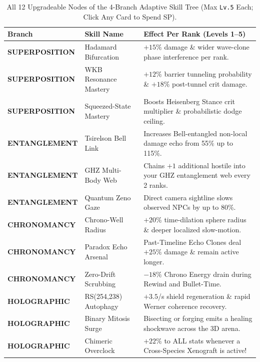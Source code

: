 \documentclass[10pt,letterpaper]{article}
\begin{document}
\begin{table}[ht]
\centering
\caption[All 12 Nodes of the 4-Branch Adaptive Skill Tree]{All 12 Upgradeable Nodes of the 4-Branch Adaptive Skill Tree (Max \texttt{Lv.5} Each; Click Any Card to Spend SP).}
\label{tab:skills}
\footnotesize
\begin{tabularx}{\textwidth}{@{} L{3.1cm} L{3.6cm} Y @{}}
\toprule
\textbf{Branch} & \textbf{Skill Name} & \textbf{Effect Per Rank (Levels 1--5)} \\
\midrule
\textbf{\color{plnCyan}SUPERPOSITION} & Hadamard Bifurcation & $+15\%$ damage \& wider wave-clone phase interference per rank. \\
\textbf{\color{plnCyan}SUPERPOSITION} & WKB Resonance Mastery & $+12\%$ barrier tunneling probability \& $+18\%$ post-tunnel crit damage. \\
\textbf{\color{plnCyan}SUPERPOSITION} & Squeezed-State Mastery & Boosts Heisenberg Stance crit multiplier \& probabilistic dodge ceiling. \\
\midrule
\textbf{\color{plnMagenta}ENTANGLEMENT} & Tsirelson Bell Link & Increases Bell-entangled non-local damage echo from 55\% up to 115\%. \\
\textbf{\color{plnMagenta}ENTANGLEMENT} & GHZ Multi-Body Web & Chains $+1$ additional hostile into your GHZ entanglement web every 2 ranks. \\
\textbf{\color{plnMagenta}ENTANGLEMENT} & Quantum Zeno Gaze & Direct camera sightline slows observed NPCs by up to 80\%. \\
\midrule
\textbf{\color{plnGold}CHRONOMANCY} & Chrono-Well Radius & $+20\%$ time-dilation sphere radius \& deeper localized slow-motion. \\
\textbf{\color{plnGold}CHRONOMANCY} & Paradox Echo Arsenal & Past-Timeline Echo Clones deal $+25\%$ damage \& remain active longer. \\
\textbf{\color{plnGold}CHRONOMANCY} & Zero-Drift Scrubbing & $-18\%$ Chrono Energy drain during Rewind and Bullet-Time. \\
\midrule
\textbf{\color{plnEmerald}HOLOGRAPHIC} & RS(254,238) Autophagy & $+3.5$/s shield regeneration \& rapid Werner coherence recovery. \\
\textbf{\color{plnEmerald}HOLOGRAPHIC} & Binary Mitosis Surge & Bisecting or forging emits a healing shockwave across the 3D arena. \\
\textbf{\color{plnEmerald}HOLOGRAPHIC} & Chimeric Overclock & $+22\%$ to ALL stats whenever a Cross-Species Xenograft is active! \\
\bottomrule
\end{tabularx}
\end{table}
\end{document}
